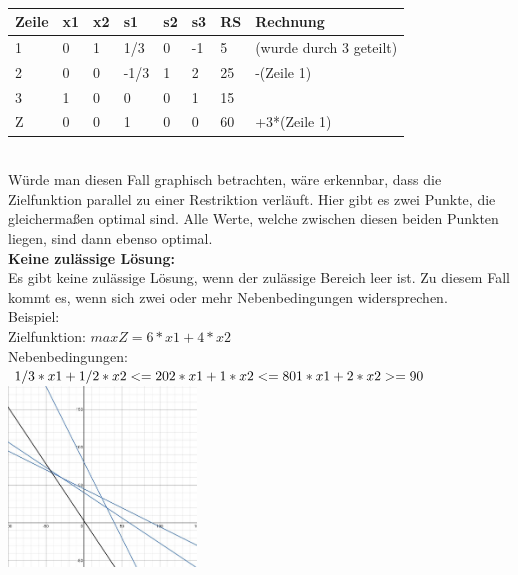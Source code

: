 \\
\begin{table}[!ht]
\begin{tabular}{|l|l|l|l|l|l|l|l|}
\hline
\rowcolor[HTML]{C0C0C0} 
Zeile                     & x1 & x2 & s1   & s2 & s3 & RS & Rechnung                \\ \hline
\rowcolor[HTML]{FFFFFF} 
\cellcolor[HTML]{C0C0C0}1 & 0  & 1  & 1/3  & 0  & -1 & 5  & (wurde durch 3 geteilt) \\ \hline
\rowcolor[HTML]{FFFFFF} 
\cellcolor[HTML]{C0C0C0}2 & 0  & 0  & -1/3 & 1  & 2  & 25 & -(Zeile 1)              \\ \hline
\rowcolor[HTML]{FFFFFF} 
\cellcolor[HTML]{C0C0C0}3 & 1  & 0  & 0    & 0  & 1  & 15 &                         \\ \hline
\rowcolor[HTML]{FFFFFF} 
\cellcolor[HTML]{C0C0C0}Z & 0  & 0  & 1    & 0  & 0  & 60 & +3*(Zeile 1)            \\ \hline
\end{tabular}
\end{table}
\\
Würde man diesen Fall graphisch betrachten, wäre erkennbar, dass die Zielfunktion parallel zu einer Restriktion verläuft. Hier gibt es zwei Punkte, die gleichermaßen optimal sind. Alle Werte, welche zwischen diesen beiden Punkten liegen, sind dann ebenso optimal.\\
\textbf{Keine zulässige Lösung: }\\
Es gibt keine zulässige Lösung, wenn der zulässige Bereich leer ist. Zu diesem Fall kommt es, wenn sich zwei oder mehr Nebenbedingungen widersprechen.\\
Beispiel:\\
Zielfunktion: \begin{math}max Z = 6*x1+4*x2\end{math}\\
Nebenbedingungen:\\
\begin{math}
1/3*x1+1/2*x2 <= 20\\
2*x1+1*x2 <= 80\\
1*x1+2*x2 >= 90\\
\end{math}
\includegraphics[width = 5cm, right]{images/IMG_keine_Losung.jpeg}
